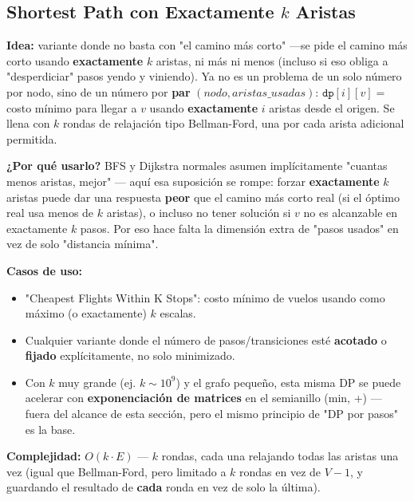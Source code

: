 \documentclass[10pt,a4paper,twocolumn]{article}
\begin{document}
\subsection{Shortest Path con Exactamente $k$ Aristas}

\textbf{Idea:} variante donde no basta con "el camino más corto"
—se pide el camino más corto usando \textbf{exactamente} $k$
aristas, ni más ni menos (incluso si eso obliga a "desperdiciar"
pasos yendo y viniendo). Ya no es un problema de un solo número por
nodo, sino de un número por \textbf{par} $(nodo, aristas\_usadas)$:
$\texttt{dp}[i][v] = $ costo mínimo para llegar a $v$ usando
\textbf{exactamente} $i$ aristas desde el origen. Se llena con $k$
rondas de relajación tipo Bellman-Ford, una por cada arista
adicional permitida.

\textbf{¿Por qué usarlo?} BFS y Dijkstra normales asumen implícitamente
"cuantas menos aristas, mejor" — aquí esa suposición se rompe: forzar
\textbf{exactamente} $k$ aristas puede dar una respuesta \textbf{peor}
que el camino más corto real (si el óptimo real usa menos de $k$
aristas), o incluso no tener solución si $v$ no es alcanzable en
exactamente $k$ pasos. Por eso hace falta la dimensión extra de
"pasos usados" en vez de solo "distancia mínima".

\textbf{Casos de uso:}

\begin{itemize}
	\item "Cheapest Flights Within K Stops": costo mínimo de vuelos
	usando como máximo (o exactamente) $k$ escalas.
	\item Cualquier variante donde el número de pasos/transiciones
	esté \textbf{acotado} o \textbf{fijado} explícitamente, no solo
	minimizado.
	\item Con $k$ muy grande (ej. $k \sim 10^9$) y el grafo pequeño,
	esta misma DP se puede acelerar con \textbf{exponenciación de
		matrices} en el semianillo (min, +) — fuera del alcance de esta
	sección, pero el mismo principio de "DP por pasos" es la base.
\end{itemize}

\textbf{Complejidad:} $O(k \cdot E)$ — $k$ rondas, cada una relajando
todas las aristas una vez (igual que Bellman-Ford, pero limitado a
$k$ rondas en vez de $V-1$, y guardando el resultado de \textbf{cada}
ronda en vez de solo la última).
\end{document}
